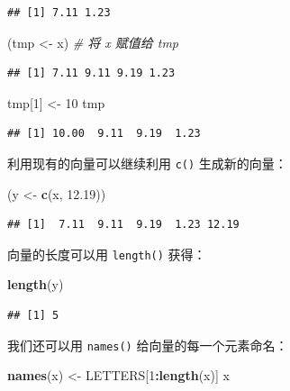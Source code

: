 \documentclass[
  b5paper,
  UTF8,twoside]{book}
\newenvironment{Shaded}{\begin{snugshade}}{\end{snugshade}}
\newcommand{\CommentTok}[1]{\textcolor[rgb]{0.56,0.35,0.01}{\textit{#1}}}
\newcommand{\DecValTok}[1]{\textcolor[rgb]{0.00,0.00,0.81}{#1}}
\newcommand{\FloatTok}[1]{\textcolor[rgb]{0.00,0.00,0.81}{#1}}
\newcommand{\FunctionTok}[1]{\textcolor[rgb]{0.13,0.29,0.53}{\textbf{#1}}}
\newcommand{\NormalTok}[1]{#1}
\newcommand{\OtherTok}[1]{\textcolor[rgb]{0.56,0.35,0.01}{#1}}
\newcommand{\SpecialCharTok}[1]{\textcolor[rgb]{0.81,0.36,0.00}{\textbf{#1}}}
\begin{document}
\begin{verbatim}
## [1] 7.11 1.23
\end{verbatim}

\begin{Shaded}
\begin{Highlighting}[]
\NormalTok{(tmp }\OtherTok{\textless{}{-}}\NormalTok{ x) }\CommentTok{\# 将 x 赋值给 tmp}
\end{Highlighting}
\end{Shaded}

\begin{verbatim}
## [1] 7.11 9.11 9.19 1.23
\end{verbatim}

\begin{Shaded}
\begin{Highlighting}[]
\NormalTok{tmp[}\DecValTok{1}\NormalTok{] }\OtherTok{\textless{}{-}} \DecValTok{10}
\NormalTok{tmp}
\end{Highlighting}
\end{Shaded}

\begin{verbatim}
## [1] 10.00  9.11  9.19  1.23
\end{verbatim}

利用现有的向量可以继续利用 \texttt{c()} 生成新的向量：

\begin{Shaded}
\begin{Highlighting}[]
\NormalTok{(y }\OtherTok{\textless{}{-}} \FunctionTok{c}\NormalTok{(x, }\FloatTok{12.19}\NormalTok{))}
\end{Highlighting}
\end{Shaded}

\begin{verbatim}
## [1]  7.11  9.11  9.19  1.23 12.19
\end{verbatim}

向量的长度可以用 \texttt{length()} 获得：

\begin{Shaded}
\begin{Highlighting}[]
\FunctionTok{length}\NormalTok{(y)}
\end{Highlighting}
\end{Shaded}

\begin{verbatim}
## [1] 5
\end{verbatim}

我们还可以用 \texttt{names()} 给向量的每一个元素命名：

\begin{Shaded}
\begin{Highlighting}[]
\FunctionTok{names}\NormalTok{(x) }\OtherTok{\textless{}{-}}\NormalTok{ LETTERS[}\DecValTok{1}\SpecialCharTok{:}\FunctionTok{length}\NormalTok{(x)]}
\NormalTok{x}
\end{Highlighting}
\end{Shaded}
\end{document}
